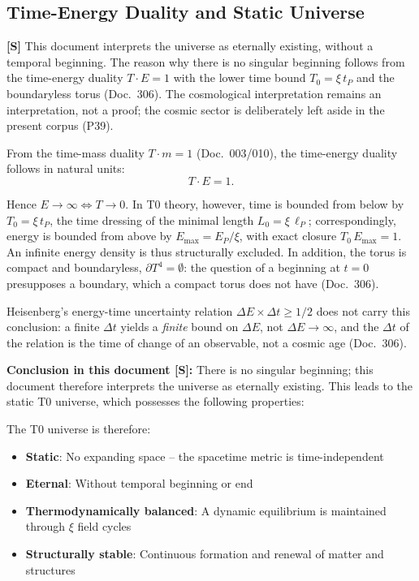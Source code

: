 	\subsection{Time-Energy Duality and Static Universe}
	
	\begin{important}
		\textbf{[S]} This document interprets the universe as eternally existing, without a temporal beginning. The reason why there is no singular beginning follows from the time-energy duality $T\cdot E = 1$ with the lower time bound $T_0 = \xi\,t_P$ and the boundaryless torus (Doc.~306). The cosmological interpretation remains an interpretation, not a proof; the cosmic sector is deliberately left aside in the present corpus (P39).
	\end{important}
	
	From the time-mass duality $T\cdot m = 1$ (Doc.~003/010), the time-energy duality follows in natural units:
	\begin{equation}
		T \cdot E = 1 .
	\end{equation}
	
	Hence $E\to\infty \Leftrightarrow T\to 0$. In T0 theory, however, time is bounded from below by $T_0 = \xi\,t_P$, the time dressing of the minimal length $L_0 = \xi\,\ell_P$; correspondingly, energy is bounded from above by $E_\text{max} = E_P/\xi$, with exact closure $T_0\,E_\text{max} = 1$. An infinite energy density is thus structurally excluded. In addition, the torus is compact and boundaryless, $\partial T^4 = \emptyset$: the question of a beginning at $t=0$ presupposes a boundary, which a compact torus does not have (Doc.~306).
	
	Heisenberg's energy-time uncertainty relation $\Delta E \times \Delta t \geq 1/2$ does not carry this conclusion: a finite $\Delta t$ yields a \emph{finite} bound on $\Delta E$, not $\Delta E\to\infty$, and the $\Delta t$ of the relation is the time of change of an observable, not a cosmic age (Doc.~306).
	
	\textbf{Conclusion in this document [S]:} There is no singular beginning; this document therefore interprets the universe as eternally existing. This leads to the static T0 universe, which possesses the following properties:
	
	The T0 universe is therefore:
	\begin{itemize}
		\item \textbf{Static}: No expanding space -- the spacetime metric is time-independent
		\item \textbf{Eternal}: Without temporal beginning or end
		\item \textbf{Thermodynamically balanced}: A dynamic equilibrium is maintained through $\xi$ field cycles
		\item \textbf{Structurally stable}: Continuous formation and renewal of matter and structures
	\end{itemize}
	
